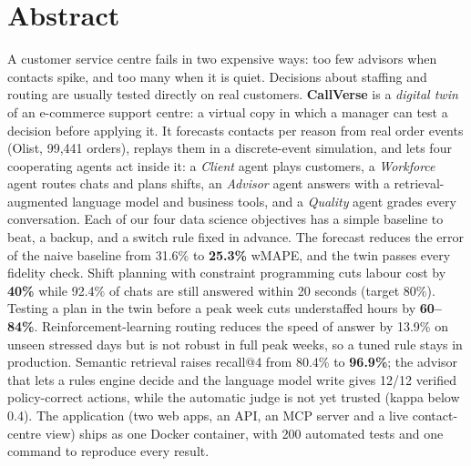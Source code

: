 \documentclass[11pt,a4paper]{article}
\newcommand{\keyfig}[1]{\textbf{#1}}
\begin{document}
\section*{Abstract}
A customer service centre fails in two expensive ways: too few advisors when contacts spike, and too many
when it is quiet. Decisions about staffing and routing are usually tested directly on real customers.
\textbf{CallVerse} is a \emph{digital twin} of an e-commerce support centre: a virtual copy in which a manager
can test a decision before applying it. It forecasts contacts per reason from real order events (Olist, 99,441
orders), replays them in a discrete-event simulation, and lets four cooperating agents act inside it: a
\emph{Client} agent plays customers, a \emph{Workforce} agent routes chats and plans shifts, an
\emph{Advisor} agent answers with a retrieval-augmented language model and business tools, and a
\emph{Quality} agent grades every conversation. Each of our four data science objectives has a simple
baseline to beat, a backup, and a switch rule fixed in advance.
The forecast reduces the error of the naive baseline from 31.6\% to \keyfig{25.3\%} wMAPE, and the twin passes
every fidelity check. Shift planning with constraint programming cuts labour cost by \keyfig{40\%} while 92.4\%
of chats are still answered within 20 seconds (target 80\%). Testing a plan in the twin before a peak week cuts
understaffed hours by \keyfig{60--84\%}. Reinforcement-learning routing reduces the speed of answer by 13.9\% on
unseen stressed days but is not robust in full peak weeks, so a tuned rule stays in production.
Semantic retrieval raises recall@4 from 80.4\% to \keyfig{96.9\%}; the advisor that lets a rules engine decide and the
language model write gives 12/12 verified policy-correct actions, while the automatic judge is not yet
trusted (kappa below 0.4). The application (two web apps, an API, an MCP server and a live contact-centre
view) ships as one Docker container, with 200 automated tests and one command to reproduce every result.

\vspace{0.3cm}
\setcounter{tocdepth}{1}
{\small\tableofcontents}
\clearpage











{\small


}
\end{document}

